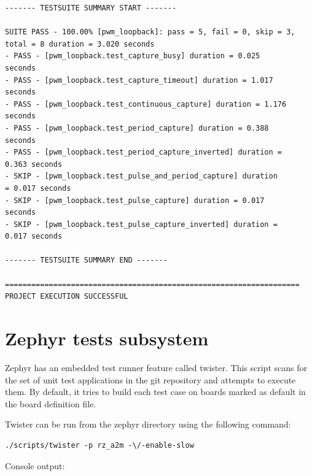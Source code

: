 \documentclass[11pt,a4paper,oneside]{article}
\begin{document}
\begin{lstlisting}
------- TESTSUITE SUMMARY START -------

SUITE PASS - 100.00% [pwm_loopback]: pass = 5, fail = 0, skip = 3,
total = 8 duration = 3.020 seconds
- PASS - [pwm_loopback.test_capture_busy] duration = 0.025
seconds
- PASS - [pwm_loopback.test_capture_timeout] duration = 1.017
seconds
- PASS - [pwm_loopback.test_continuous_capture] duration = 1.176
seconds
- PASS - [pwm_loopback.test_period_capture] duration = 0.388
seconds
- PASS - [pwm_loopback.test_period_capture_inverted] duration =
0.363 seconds
- SKIP - [pwm_loopback.test_pulse_and_period_capture] duration
= 0.017 seconds
- SKIP - [pwm_loopback.test_pulse_capture] duration = 0.017
seconds
- SKIP - [pwm_loopback.test_pulse_capture_inverted] duration =
0.017 seconds

------- TESTSUITE SUMMARY END -------

===================================================================
PROJECT EXECUTION SUCCESSFUL
\end{lstlisting}

\section{Zephyr tests subsystem}\label{zephyr-tests-subsystem}

Zephyr has an embedded test runner feature called twister. This script
scans for the set of unit test applications in the git repository and
attempts to execute them. By default, it tries to build each test case
on boards marked as default in the board definition file.

Twister can be run from the zephyr directory using the following
command:

\begin{lstlisting}
./scripts/twister -p rz_a2m -\/-enable-slow
\end{lstlisting}

Console output:
\end{document}
